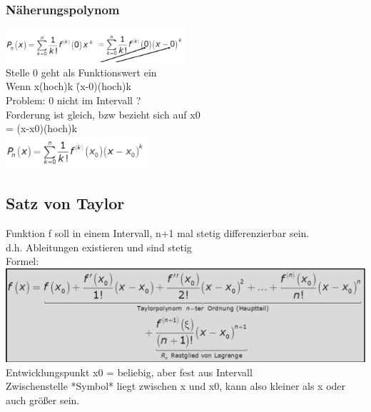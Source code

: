 \documentclass[12pt,a4paper]{article}
\begin{document}
\subsubsection{Näherungspolynom}
\includegraphics[width=0.5\textwidth]{Bilder/V1/6.png}\\
Stelle 0 geht als Funktionswert ein\\
Wenn x(hoch)k \= (x-0)(hoch)k\\
Problem: 0 nicht im Intervall ?\\
Forderung ist gleich, bzw bezieht sich auf x0\\
= (x-x0)(hoch)k\\
\includegraphics[width=0.4\textwidth]{Bilder/V1/7.png}

\subsection{Satz von Taylor}
Funktion f soll in einem Intervall, n+1 mal stetig differenzierbar sein.\\
d.h. Ableitungen existieren und sind stetig\\
Formel:\\
\includegraphics[width=1\textwidth]{Bilder/V1/8.png}\\
Entwicklungspunkt x0 = beliebig, aber fest aus Intervall\\
Zwischenstelle *Symbol* liegt zwischen x und x0, kann also kleiner als x oder auch größer sein.\\
\end{document}
